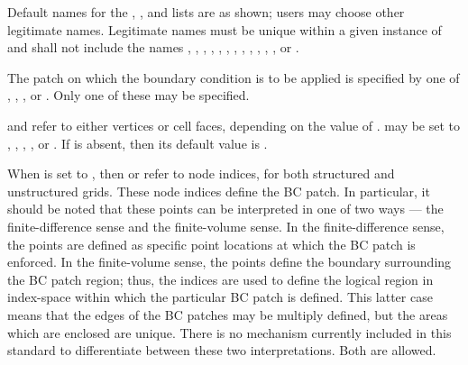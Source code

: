 \begin{notes}
\item Default names for the , , and
      lists are as shown; users may choose other legitimate names.
      Legitimate names must be unique within a given instance
      of  and shall not include the names
      , , ,
      , , ,
      , , ,
      , , ,
       or .
\item The patch on which the boundary condition is to be applied
      is specified by one of , ,
      , or .
      Only one of these may be specified.
\item {} and  refer to either vertices
      or cell faces, depending on the value of .
       may be set to , ,
      , , or .
      If  is absent, then its default value is
      .
      
      \vspace{0.5\baselineskip}
      When  is set to , then
       or  refer to node indices, for
      both structured and unstructured grids.
      These node indices define the BC patch.
      In particular, it should be noted that these points can be
      interpreted in one of two ways --- the finite-difference sense and
      the finite-volume sense.
      In the finite-difference sense, the points are defined as specific
      point locations at which the BC patch is enforced.
      In the finite-volume sense, the points define the boundary
      surrounding the BC patch region; thus, the indices are used
      to define the logical region in index-space within which the
      particular BC patch is defined.
      This latter case means that the edges of the BC patches may be
      multiply defined, but the areas which are enclosed are unique.
      There is no mechanism currently included in this standard to
      differentiate between these two interpretations.
      Both are allowed.


\end{notes}
